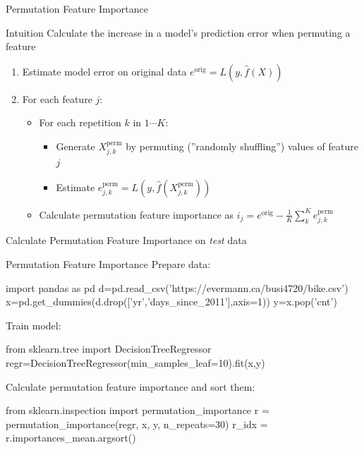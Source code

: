 \documentclass[ignorenonframetext,xcolor=x11names]{beamer}
\begin{document}
\begin{frame}[label=full]{Permutation Feature Importance}

\begin{block}{Intuition}
Calculate the increase in a model's prediction error when permuting a feature
\end{block}

\begin{enumerate}
\item Estimate model error on original data $e^{\text{orig}} = L(y, \hat{f}(X))$
\item For each feature $j$:
  \begin{itemize}
     \item For each repetition $k$ in $1 \cdots K$:
     \begin{itemize}
        \item Generate $X^{\text{perm}}_{j, k}$ by permuting (''randomly shuffling'') values of feature $j$
        \item Estimate $e^{\text{perm}}_{j, k} = L(y, \hat{f}(X^{\text{perm}}_{j, k}))$
     \end{itemize}
     \item Calculate permutation feature importance as $i_j = e^{\text{orig}} - \frac{1}{K}\sum_k^K e^{\text{perm}}_{j, k}$
  \end{itemize}
\end{enumerate}
\begin{block}{}
Calculate Permutation Feature Importance on \emph{test} data
\end{block}
\end{frame}

\begin{frame}[label=withcode,fragile]{Permutation Feature Importance}
Prepare data:
\begin{pythoncode}
import pandas as pd
d=pd.read_csv('https://evermann.ca/busi4720/bike.csv')
x=pd.get_dummies(d.drop(['yr','days_since_2011'],axis=1))
y=x.pop('cnt')
\end{pythoncode}
Train model:
\begin{pythoncode}
from sklearn.tree import DecisionTreeRegressor
regr=DecisionTreeRegressor(min_samples_leaf=10).fit(x,y)
\end{pythoncode}
Calculate permutation feature importance and sort them:
\begin{pythoncode}
from sklearn.inspection import permutation_importance
r = permutation_importance(regr, x, y, n_repeats=30)
r_idx = r.importances_mean.argsort()
\end{pythoncode}
\end{frame}
\end{document}
